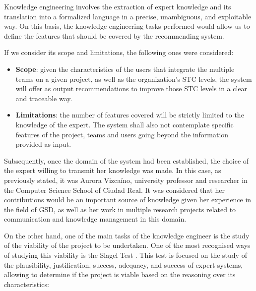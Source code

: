 Knowledge engineering involves the extraction of expert knowledge and its translation into a formalized language in a precise, unambiguous, and exploitable way. On this basis, the knowledge engineering tasks performed would allow us to define the features that should be covered by the recommending system. 

If we consider its scope and limitations, the following ones were considered:

\begin{itemize}
	\item \textbf{Scope}: given the characteristics of the users that integrate the multiple teams on a given project, as well as the organization's STC levels, the system will offer as output recommendations to improve those STC levels in a clear and traceable way.
	\item \textbf{Limitations}: the number of features covered will be strictly limited to the knowledge of the expert. The system shall also not contemplate specific features of the project, teams and users going beyond the information provided as input.
\end{itemize}

Subsequently, once the domain of the system had been established, the choice of the expert willing to transmit her knowledge was made. In this case, as previously stated, it was Aurora Vizcaíno, university professor and researcher in the Computer Science School of Ciudad Real. It was considered that her contributions would be an important source of knowledge given her experience in the field of GSD, as well as her work in multiple research projects related to communication and knowledge management in this domain.

On the other hand, one of the main tasks of the knowledge engineer is the study of the viability of the project to be undertaken. One of the most recognised ways of studying this viability is the Slagel Test \cite{mate_1998}. This test is focused on the study of the plausibility, justification, success, adequacy, and success of expert systems, allowing to determine if the project is viable based on the reasoning over its characteristics:

